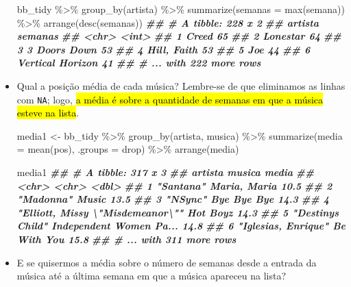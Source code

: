 \documentclass[
  11pt]{report}
\newenvironment{Shaded}{\begin{snugshade}}{\end{snugshade}}
\newcommand{\AttributeTok}[1]{\textcolor[rgb]{0.77,0.63,0.00}{#1}}
\newcommand{\DocumentationTok}[1]{\textcolor[rgb]{0.56,0.35,0.01}{\textbf{\textit{#1}}}}
\newcommand{\FunctionTok}[1]{\textcolor[rgb]{0.00,0.00,0.00}{#1}}
\newcommand{\NormalTok}[1]{#1}
\newcommand{\OtherTok}[1]{\textcolor[rgb]{0.56,0.35,0.01}{#1}}
\newcommand{\SpecialCharTok}[1]{\textcolor[rgb]{0.00,0.00,0.00}{#1}}
\newcommand{\StringTok}[1]{\textcolor[rgb]{0.31,0.60,0.02}{#1}}
\renewenvironment{Shaded}{
    \begin{mdframed}[%
      roundcorner=2pt,%
      innerleftmargin=5pt,%
      innerrightmargin=5pt,%
      topline=true,%
      leftline=true,%
      rightline=true,%
      bottomline=true,%
      linewidth=0.5pt,%
      linecolor=black!20,%
      backgroundcolor=black!2,%
      skipabove=2ex,%
      skipbelow=2.5ex%
    ]%
  }
  {
    \end{mdframed}
  }
\begin{document}
\begin{itemize}
\begin{Shaded}
\begin{Highlighting}[]
\NormalTok{bb\_tidy }\SpecialCharTok{\%\textgreater{}\%} 
  \FunctionTok{group\_by}\NormalTok{(artista) }\SpecialCharTok{\%\textgreater{}\%} 
  \FunctionTok{summarize}\NormalTok{(}\AttributeTok{semanas =} \FunctionTok{max}\NormalTok{(semana)) }\SpecialCharTok{\%\textgreater{}\%} 
  \FunctionTok{arrange}\NormalTok{(}\FunctionTok{desc}\NormalTok{(semanas))}
\DocumentationTok{\#\# \# A tibble: 228 x 2}
\DocumentationTok{\#\#   artista          semanas}
\DocumentationTok{\#\#   \textless{}chr\textgreater{}              \textless{}int\textgreater{}}
\DocumentationTok{\#\# 1 Creed                 65}
\DocumentationTok{\#\# 2 Lonestar              64}
\DocumentationTok{\#\# 3 3 Doors Down          53}
\DocumentationTok{\#\# 4 Hill, Faith           53}
\DocumentationTok{\#\# 5 Joe                   44}
\DocumentationTok{\#\# 6 Vertical Horizon      41}
\DocumentationTok{\#\# \# ... with 222 more rows}
\end{Highlighting}
\end{Shaded}
\item
  Qual a posição média de cada música? Lembre-se de que eliminamos as linhas com \texttt{NA}; logo, {\hl{a média é sobre a quantidade de semanas em que a música esteve na lista}}.

\begin{Shaded}
\begin{Highlighting}[]
\NormalTok{media1 }\OtherTok{\textless{}{-}}\NormalTok{ bb\_tidy }\SpecialCharTok{\%\textgreater{}\%} 
  \FunctionTok{group\_by}\NormalTok{(artista, musica) }\SpecialCharTok{\%\textgreater{}\%} 
  \FunctionTok{summarize}\NormalTok{(}\AttributeTok{media =} \FunctionTok{mean}\NormalTok{(pos), }\AttributeTok{.groups =} \StringTok{\textquotesingle{}drop\textquotesingle{}}\NormalTok{) }\SpecialCharTok{\%\textgreater{}\%} 
  \FunctionTok{arrange}\NormalTok{(media)}

\NormalTok{media1}
\DocumentationTok{\#\# \# A tibble: 317 x 3}
\DocumentationTok{\#\#   artista                          musica                  media}
\DocumentationTok{\#\#   \textless{}chr\textgreater{}                            \textless{}chr\textgreater{}                   \textless{}dbl\textgreater{}}
\DocumentationTok{\#\# 1 "Santana"                        Maria, Maria             10.5}
\DocumentationTok{\#\# 2 "Madonna"                        Music                    13.5}
\DocumentationTok{\#\# 3 "N\textquotesingle{}Sync"                         Bye Bye Bye              14.3}
\DocumentationTok{\#\# 4 "Elliott, Missy \textbackslash{}"Misdemeanor\textbackslash{}"" Hot Boyz                 14.3}
\DocumentationTok{\#\# 5 "Destiny\textquotesingle{}s Child"                Independent Women Pa...  14.8}
\DocumentationTok{\#\# 6 "Iglesias, Enrique"              Be With You              15.8}
\DocumentationTok{\#\# \# ... with 311 more rows}
\end{Highlighting}
\end{Shaded}
\item
  E se quisermos a média sobre o número de semanas desde a entrada da música até a última semana em que a música apareceu na lista?


\end{itemize}
\end{document}
